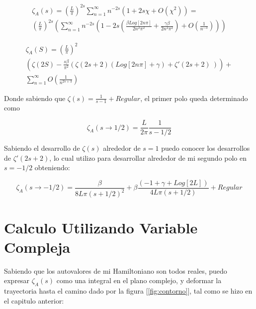 \begin{equation}
\begin{array}{c}
    \zeta _A (s) = ( \frac{L}{\pi} ) ^{2 s}
    \sum _{n=1} ^{\infty} 
    n ^{-2s}
    \left(
    1 + 2 s \chi + O(\chi ^2)
    \right) =  \\
    ( \frac{L}{\pi} ) ^{2 s}
    \left(
    \sum _{n=1} ^{\infty} n ^{-2 s} 
    \left(
    1 - 2s \left(
    \frac{\beta Log[2 n \pi]}{2 n ^2 \pi ^2} + 
    \frac{\gamma \beta}{2 n ^2 \pi ^2} 
	\right) +
    O (\frac{1}{n ^{-3} }  )
    \right)
    \right)
\end{array}
\end{equation}


\begin{equation}
\begin{array}{c}
    \zeta _A (S) = 
    \left( \frac{L }{ \pi } \right) ^{2}  \\
    \left(
    \zeta (2 S) -
	\frac{ s \beta}{ \pi ^2}
	\left(
	\zeta (2s+2)  ( Log[2 n \pi ] + \gamma) +
	\zeta '(2s+2) \
	\right)
    \right) + \\
    \sum _{n=1} ^{\infty} O \left( \frac{1}{n ^{2s+3}} \right)
\end{array}
\end{equation}

Donde sabiendo que $\zeta(s) = \frac{1}{s-1} + Regular$, el primer polo queda determinado como

\begin{equation}
    \zeta _A (s \rightarrow 1/2) = \frac{L}{2 \pi} \frac{1}{s-1/2}    
\end{equation}

Sabiendo el desarrollo de $\zeta(s)$ alrededor de $s=1$ puedo conocer los desarrollos de $\zeta'(2s+2)$, lo cual utilizo para desarrollar alrededor de mi segundo polo en $s = -1/2$ obteniendo:

\begin{equation}
    \zeta _A (s \rightarrow -1/2 ) =  \frac{\beta}{8 L \pi (s+1/2)^2} +
    \beta \frac{(-1 + \gamma + Log[2L ])}{4 L \pi (s+1/2)} + 
    Regular
\end{equation}

\section{Calculo Utilizando Variable Compleja}


Sabiendo que los autovalores de mi Hamiltoniano son todos reales, puedo expresar $\zeta _A (s)$ como una integral en el plano complejo, y deformar la trayectoria hasta el camino dado por la figura [\ref{fig:contorno}], tal como se hizo en el capitulo anterior: \\

